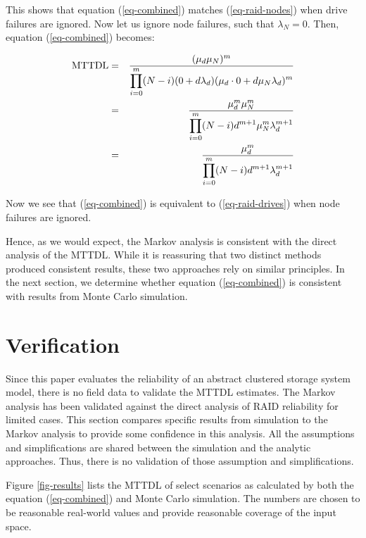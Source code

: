 \documentclass[11pt]{article}
\newcommand{\mttdl}{{\rm MTTDL}}
\numberwithin{equation}{section}
\begin{document}
This shows that equation (\ref{eq-combined}) matches (\ref{eq-raid-nodes})
when drive failures are ignored.  Now let us ignore node failures, such that
$\lambda_{N} = 0$.  Then, equation (\ref{eq-combined}) becomes:

\begin{eqnarray}
\mttdl & = & \frac{(\mu_{d}\mu_{N})^{m}}
{\displaystyle \prod_{i=0}^{m} 
(N - i)(0 + d\lambda_{d})
(\mu_{d}\cdot 0 + d \mu_{N} \lambda_{d})^{m}}
\\
& = & \frac{\mu_{d}^{m}\mu_{N}^{m}}
{\displaystyle \prod_{i=0}^{m} 
(N - i)d^{m+1}
\mu_{N}^{m} \lambda_{d}^{m+1}}
\\
& = & \frac{\mu_{d}^{m}}
{\displaystyle \prod_{i=0}^{m} 
(N - i)d^{m+1} \lambda_{d}^{m+1}}
\\
\end{eqnarray}

Now we see that (\ref{eq-combined}) is equivalent to (\ref{eq-raid-drives})
when node failures are ignored.  

Hence, as we would expect, the Markov analysis is consistent with the direct
analysis of the MTTDL.  While it is reassuring that two distinct methods
produced consistent results, these two approaches rely on similar principles.
In the next section, we determine whether equation (\ref{eq-combined}) is
consistent with results from Monte Carlo simulation.

\section{Verification}

Since this paper evaluates the reliability of an abstract clustered storage
system model, there is no field data to validate the MTTDL estimates.  The
Markov analysis has been validated against the direct analysis of RAID
reliability for limited cases.  This section compares specific results from
simulation to the Markov analysis to provide some confidence in this analysis.
All the assumptions and simplifications are shared between the simulation and
the analytic approaches.  Thus, there is no validation of those assumption and
simplifications.

Figure \ref{fig-results} lists the MTTDL of select scenarios as calculated by
both the equation (\ref{eq-combined}) and Monte Carlo simulation.  The numbers
are chosen to be reasonable real-world values and provide reasonable coverage
of the input space.
\end{document}
